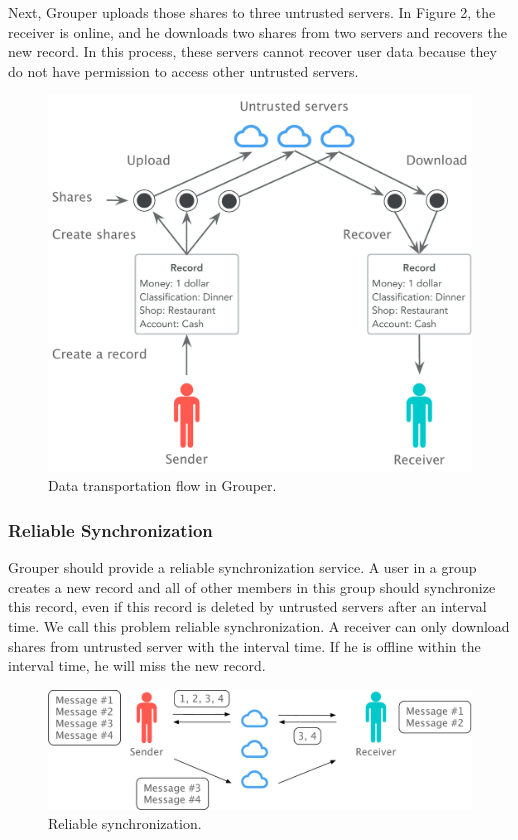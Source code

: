 \documentclass[twocolumn,10pt]{article}
\begin{document}
Next, Grouper uploads those shares to three untrusted servers. 
In Figure 2, the receiver is online, and he downloads two shares from two servers and recovers the new record. 
In this process, these servers cannot recover user data because they do not have permission to access other untrusted servers. 

\begin{figure}[t]
	\centering
	\includegraphics[scale=0.36]{sync_flow}
	\caption{Data transportation flow in Grouper.}
\end{figure}

\subsubsection{Reliable Synchronization}

Grouper should provide a reliable synchronization service. 
A user in a group creates a new record and all of other members in this group should synchronize this record, even if this record is deleted by untrusted servers after an interval time. 
We call this problem reliable synchronization. 
A receiver can only download shares from untrusted server with the interval time. 
If he is offline within the interval time, he will miss the new record.

\begin{figure}[t]
	\centering
	\includegraphics[scale=0.32]{reliable_sync}
	\caption{Reliable synchronization.}
\end{figure}
\end{document}
